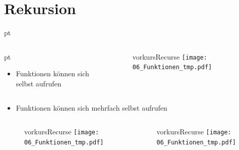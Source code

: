 \section{Rekursion}
\begin{frame}[t]
	\slidehead

	 pt
	\begin{columns}
		\begin{column}{4.5cm}
			 pt
			\begin{itemize}
				\item Funktionen können sich selbst aufrufen
			\end{itemize}
		\end{column}

		\begin{column}{7cm}
			\begin{figure}
				\ifcsname vorkursRecurse\endcsname
					\texttt{[image: 06\_Funktionen\_tmp.pdf]}
				\fi
			\end{figure}
		\end{column}
	\end{columns}
\end{frame}

\begin{frame}[t]
	\slidehead

	\begin{itemize}
		\item Funktionen können sich mehrfach selbst aufrufen
	\end{itemize}

	\begin{columns}
		\begin{column}{5cm}
			\begin{figure}
				\ifcsname vorkursRecurse\endcsname
					\texttt{[image: 06\_Funktionen\_tmp.pdf]}
				\fi
			\end{figure}
		\end{column}

		\begin{column}{5cm}
			\begin{figure}
				\ifcsname vorkursRecurse\endcsname
					\texttt{[image: 06\_Funktionen\_tmp.pdf]}
				\fi
			\end{figure}
		\end{column}
	\end{columns}
\end{frame}

